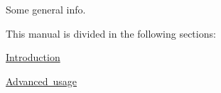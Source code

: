 Some general info.

This manual is divided in the following sections\+:
\begin{DoxyItemize}
\item \mbox{\hyperlink{intro}{Introduction}}
\item \mbox{\hyperlink{advanced}{Advanced usage}} 
\end{DoxyItemize}